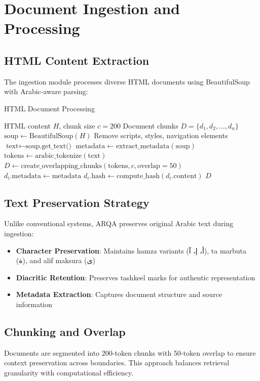 \documentclass[conference]{IEEEtran}
\begin{document}
\section{Document Ingestion and Processing}

\subsection{HTML Content Extraction}
The ingestion module processes diverse HTML documents using BeautifulSoup \cite{b8} with Arabic-aware parsing:

\begin{algorithm}
\caption{HTML Document Processing}
\begin{algorithmic}[1]
\REQUIRE HTML content $H$, chunk size $c = 200$
\ENSURE Document chunks $D = \{d_1, d_2, ..., d_n\}$
\STATE $\text{soup} \leftarrow \text{BeautifulSoup}(H)$
\STATE Remove scripts, styles, navigation elements
\STATE $\text{text} \leftarrow \text{soup.get\_text()}$
\STATE $\text{metadata} \leftarrow \text{extract\_metadata}(\text{soup})$
\STATE $\text{tokens} \leftarrow \text{arabic\_tokenize}(\text{text})$
\STATE $D \leftarrow \text{create\_overlapping\_chunks}(\text{tokens}, c, \text{overlap}=50)$
    \STATE $d_i.\text{metadata} \leftarrow \text{metadata}$
    \STATE $d_i.\text{hash} \leftarrow \text{compute\_hash}(d_i.\text{content})$
\ENDFOR
\RETURN $D$
\end{algorithmic}
\end{algorithm}

\subsection{Text Preservation Strategy}
Unlike conventional systems, ARQA preserves original Arabic text during ingestion:
\begin{itemize}
    \item \textbf{Character Preservation}: Maintains hamza variants (أ، إ، آ), ta marbuta (ة), and alif maksura (ى)
    \item \textbf{Diacritic Retention}: Preserves tashkeel marks for authentic representation
    \item \textbf{Metadata Extraction}: Captures document structure and source information
\end{itemize}

\subsection{Chunking and Overlap}
Documents are segmented into 200-token chunks with 50-token overlap to ensure context preservation across boundaries. This approach balances retrieval granularity with computational efficiency.
\end{document}
